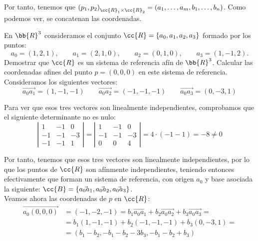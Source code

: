 \begin{ejercicio}
\begin{enumerate}
    Por tanto, tenemos que ${(p_1,p_2)}_{\cc{R}_1\times \cc{R}_2}=(a_1,\dots, a_m,b_1,\dots,b_n)$. Como podemos ver, se concatenan las coordenadas.
\end{enumerate}
\end{ejercicio}



\begin{ejercicio}
    En $\bb{R}^3$ consideramos el conjunto $\cc{R} = \{a_0, a_1, a_2, a_3\}$ formado por los puntos:
    \begin{equation*}
        a_0 = (1, 2, 1),\qquad  a_1 = (2, 1, 0),\qquad a_2 = (0, 1, 0),\qquad a_3 = (1,-1, 2).
    \end{equation*}
    Demostrar que $\cc{R}$ es un sistema de referencia afín de $\bb{R}^3$. Calcular las coordenadas afines del punto $p = (0, 0, 0)$ en este sistema de referencia.\\

    Consideramos los siguientes vectores:
    \begin{equation*}
        \vec{a_0a_1} = (1,-1,-1) \qquad \vec{a_0a_2} = (-1,-1,-1) \qquad \vec{a_0a_3} = (0,-3,1)
    \end{equation*}

    Para ver que esos tres vectores son linealmente independientes, comprobamos que el siguiente determinante no es nulo:
    \begin{equation*}
        \left|\begin{array}{ccc}
            1 & -1 & 0 \\
            -1 & -1 & -3 \\
            -1& -1 & 1
        \end{array}\right| = \left|\begin{array}{ccc}
            1 & -1 & 0 \\
            -1 & -1 & -3 \\
            0& 0 & 4
        \end{array}\right| = 4\cdot (-1 -1)=-8\neq 0
    \end{equation*}

    Por tanto, tenemos que esos tres vectores son linealmente independientes, por lo que los puntos de $\cc{R}$ son afínmente independientes, teniendo entonces efectivamente que forman un sistema de referencia, con origen $a_0$ y base asociada la siguiente: $\cc{B}=\{\vec{a_0a_1},\vec{a_0a_2},\vec{a_0a_3}\}$.\\

    Veamos ahora las coordenadas de $p$ en $\cc{R}$:
    \begin{equation*}\begin{split}
        \vec{a_0(0,0,0)} &= (-1,-2,-1) = b_1\vec{a_0a_1} + b_2\vec{a_0a_2} + b_3\vec{a_0a_3}= \\
        & = b_1(1,-1,-1) +b_2(-1,-1,-1) + b_3(0,-3,1) =\\
        &= (b_1-b_2, -b_1-b_2-3b_3, -b_1-b_2+b_3)
    \end{split}\end{equation*}


\end{ejercicio}
